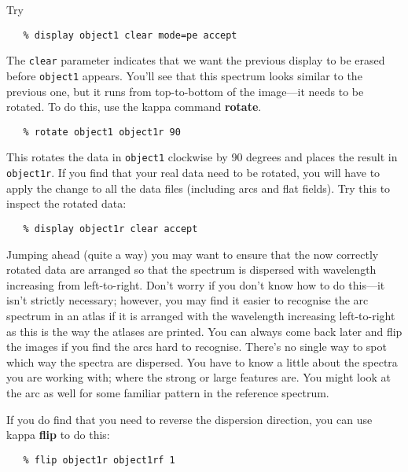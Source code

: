 \documentclass[twoside,11pt]{article}
\newcommand{\xref}[3]{#1}
\newcommand{\scspec}[2]{#1}
\newcommand{\scspec}[2]{#2}
\begin{document}
Try

{
\scspec{\small}{ }
\begin{verbatim}
   % display object1 clear mode=pe accept
\end{verbatim}
}

The \verb+clear+ parameter indicates that we want the previous display to
be erased before \verb+object1+ appears.
You'll see that this spectrum looks similar to the previous one, but it runs
from top-to-bottom of the image\scspec{---}{ - }it needs to be rotated.
To do this, use the {\sc kappa} command \xref{{\bf rotate}}{sun95}{ROTATE}.

{
\scspec{\small}{ }
\begin{verbatim}
   % rotate object1 object1r 90
\end{verbatim}
}

This rotates the data in \verb+object1+ clockwise by 90 degrees and places
the result in \verb+object1r+\@.  If you find that your real data need to be
rotated, you will have to apply the change to all the data files (including
arcs and flat fields).  Try this to inspect the rotated data:

{
\scspec{\small}{ }
\begin{verbatim}
   % display object1r clear accept
\end{verbatim}
}

Jumping ahead (quite a way) you may want to ensure that the now correctly
rotated data are arranged so that the spectrum is dispersed with wavelength
increasing from left-to-right.  Don't worry if you don't know how to do
this\scspec{---}{ - }it isn't strictly necessary; however, you may find it
easier to recognise the arc spectrum in an atlas if it is arranged with the
wavelength increasing left-to-right as this is the way the atlases are
printed.
You can always come back later and flip the images if you find the arcs hard
to recognise.
There's no single way to spot which way the spectra are dispersed.
You have to know a little about the spectra you are working with;
where the strong or large features are.  You might look at the arc as
well for some familiar pattern in the reference spectrum.

If you do find that you need to reverse the dispersion direction, you can use
{\sc kappa} \xref{{\bf flip}}{sun95}{FLIP} to do this:

{
\scspec{\small}{ }
\begin{verbatim}
   % flip object1r object1rf 1
\end{verbatim}
}
\end{document}

